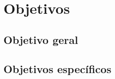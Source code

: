 \chapter{Objetivos}
\label{cap:objetivos}

\section{Objetivo geral}


\section{Objetivos específicos}


